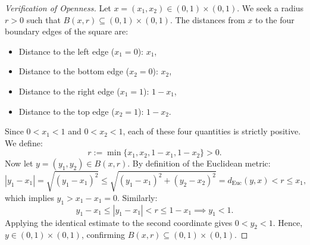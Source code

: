 \begin{content}

\begin{proof}[Verification of Openness]
Let $x = (x_1, x_2) \in (0, 1) \times (0, 1)$. We seek a radius $r > 0$ such that $B(x, r) \subseteq (0, 1) \times (0, 1)$.
The distances from $x$ to the four boundary edges of the square are:
\begin{itemize}
    \item Distance to the left edge ($x_1 = 0$): $x_1$,
    \item Distance to the bottom edge ($x_2 = 0$): $x_2$,
    \item Distance to the right edge ($x_1 = 1$): $1 - x_1$,
    \item Distance to the top edge ($x_2 = 1$): $1 - x_2$.
\end{itemize}
Since $0 < x_1 < 1$ and $0 < x_2 < 1$, each of these four quantities is strictly positive. We define:
\begin{equation}\label{eq:min-radius-square}
r := \min \{ x_1, x_2, 1 - x_1, 1 - x_2 \} > 0.
\end{equation}
Now let $y = (y_1, y_2) \in B(x, r)$. By definition of the Euclidean metric:
\[
|y_1 - x_1| = \sqrt{(y_1 - x_1)^2} \le \sqrt{(y_1 - x_1)^2 + (y_2 - x_2)^2} = d_{\text{Euc}}(y, x) < r \le x_1,
\]
which implies $y_1 > x_1 - x_1 = 0$. Similarly:
\[
y_1 - x_1 \le |y_1 - x_1| < r \le 1 - x_1 \implies y_1 < 1.
\]
Applying the identical estimate to the second coordinate gives $0 < y_2 < 1$. Hence, $y \in (0, 1) \times (0, 1)$, confirming $B(x, r) \subseteq (0, 1) \times (0, 1)$.
\end{proof}

\begin{center}
\begin{tikzpicture}[scale=2.5]


\end{tikzpicture}
\end{center}
\end{content}
